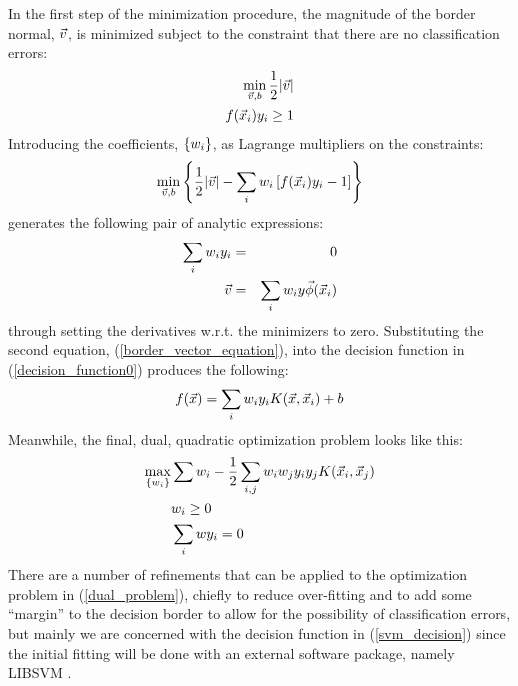 \documentclass{article}
\begin{document}
In the first step of the minimization procedure, 
the magnitude of the border normal, $\vec v$, 
is minimized subject to the constraint that there are no classification 
errors:
\begin{eqnarray}
	\min_{\vec v, b} \frac{1}{2} | \vec v | \\ \nonumber
	f(\vec {x}_i) y_i \ge 1
\end{eqnarray}
Introducing the coefficients, $\lbrace w_i \rbrace$, 
as Lagrange multipliers on the constraints:
\begin{equation}
	\min_{\vec v, b} \left \lbrace \frac{1}{2} | \vec v | - \sum_i w_i \left [ f(\vec {x}_i) y_i -1 \right ] \right \rbrace
\end{equation}
generates the following pair of analytic expressions:
\begin{eqnarray}
	\sum_i w_i y_i & = & 0 \\
	\vec v & = & \sum_i w_i y \vec\phi(\vec {x}_i) \label{border_vector_equation}
\end{eqnarray}
through setting the derivatives w.r.t. the minimizers to zero.
Substituting the second equation, (\ref{border_vector_equation}),
into the decision function in (\ref{decision_function0}) produces the following:
\begin{equation}
	f(\vec {x}) = \sum_i w_i y_i K (\vec {x}, \vec {x}_i) + b
	\label{svm_decision}
\end{equation}
Meanwhile, the final, dual, quadratic optimization problem looks like this:
\begin{eqnarray}
	\max_{\lbrace w_i \rbrace} & \sum w_i 
	- \frac{1}{2} \sum_{i, j} w_i w_j y_i y_j K(\vec {x}_i, \vec {x}_j) \\ \nonumber
	& w_i \ge 0 \\ \nonumber
	& \sum_i w y_i = 0 \label{dual_problem}
\end{eqnarray}
There are a number of refinements that can be applied to the optimization
problem in (\ref{dual_problem}), chiefly to reduce over-fitting and to add
some ``margin'' to the decision border to allow for the possibility of
classification errors, but mainly we are concerned with the decision
function in (\ref{svm_decision}) since the initial fitting will be done with
an external software package, namely LIBSVM \citep{Chang_Lin2011}.
\end{document}
